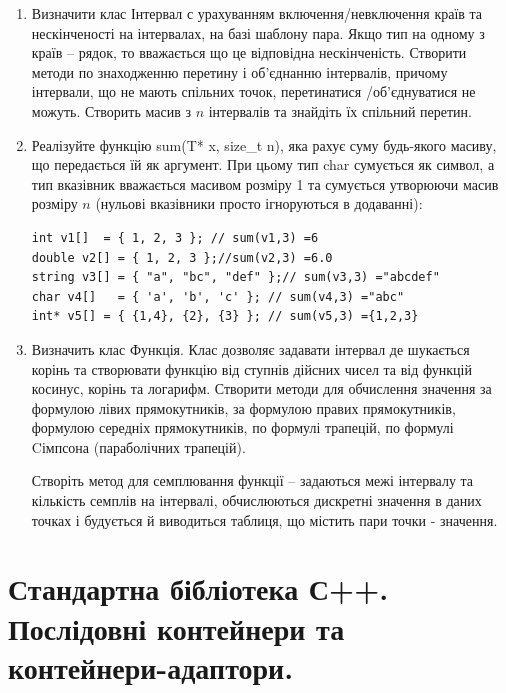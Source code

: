 \documentclass[a5paper,titlepage,openany,twoside,
]
{book_unv}%
\begin{document}
\begin{enumerate}
\begin{enumerate}
\begin{enumerate}
\item
Визначити клас Інтервал с урахуванням включення/невключення країв та нескінченості на інтервалах,
на базі шаблону пара. Якщо тип на одному з країв -- рядок, то вважається
що це відповідна нескінченість.  
Створити методи по знаходженню перетину і об'єднанню інтервалів,
причому інтервали, що не мають спільних точок, перетинатися /об'єднуватися не можуть.
Створить масив з $n$ інтервалів та знайдіть їх спільний перетин.
 
\item
Реалізуйте функцію sum(T* x, size\_t n), яка рахує суму будь-якого масиву, що передається їй як аргумент.
При цьому тип char сумується як символ, а тип вказівник вважається масивом розміру 1 та сумується утворюючи
масив розміру $n$ (нульові вказівники просто ігноруються в додаванні):
\begin{verbatim}
int v1[]  = { 1, 2, 3 }; // sum(v1,3) =6
double v2[] = { 1, 2, 3 };//sum(v2,3) =6.0
string v3[] = { "a", "bc", "def" };// sum(v3,3) ="abcdef"
char v4[]   = { 'a', 'b', 'c' }; // sum(v4,3) ="abc"
int* v5[] = { {1,4}, {2}, {3} }; // sum(v5,3) ={1,2,3}
\end{verbatim}

\item
Визначить клас Функція. Клас дозволяє задавати інтервал де шукається корінь та створювати функцію
від ступнів дійсних чисел та від функцій косинус, корінь та логарифм.
Створити методи для обчислення значення за формулою лівих прямокутників,
за формулою правих прямокутників, формулою середніх прямокутників,
по формулі трапецій, по формулі Cімпсона (параболічних трапецій).

Створіть метод для семплювання функції -- задаються межі інтервалу та кількість
семплів на інтервалі, обчислюються дискретні значення в даних точках і будується
 й виводиться таблиця, що містить пари точки - значення.

\end{enumerate}


\chapter{Стандартна бібліотека С++. Послідовні контейнери та контейнери-адаптори.}
%


\end{enumerate}
\end{enumerate}
\end{document}
